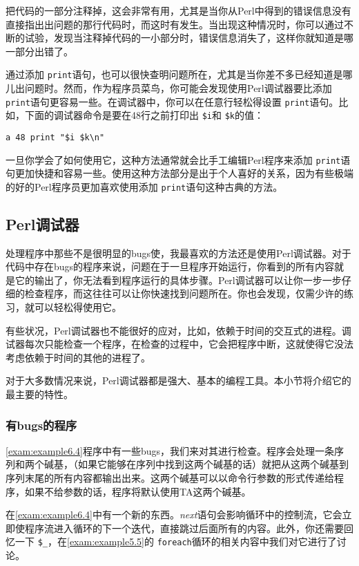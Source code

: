 把代码的一部分注释掉，这会非常有用，尤其是当你从Perl中得到的错误信息没有直接指出出问题的那行代码时，而这时有发生。当出现这种情况时，你可以通过不断的试验，发现当注释掉代码的一小部分时，错误信息消失了，这样你就知道是哪一部分出错了。

通过添加 \verb|print|语句，也可以很快查明问题所在，尤其是当你差不多已经知道是哪儿出问题时。然而，作为程序员菜鸟，你可能会发现使用Perl调试器要比添加 \verb|print|语句更容易一些。在调试器中，你可以在任意行轻松得设置 \verb|print|语句。比如，下面的调试器命令是要在48行之前打印出 \verb|$i|和 \verb|$k|的值：

\begin{lstlisting}
a 48 print "$i $k\n"
\end{lstlisting}

一旦你学会了如何使用它，这种方法通常就会比手工编辑Perl程序来添加 \verb|print|语句更加快捷和容易一些。使用这种方法部分是出于个人喜好的关系，因为有些极端的好的Perl程序员更加喜欢使用添加 \verb|print|语句这种古典的方法。

\subsection{Perl调试器}
处理程序中那些不是很明显的bugs使，我最喜欢的方法还是使用Perl调试器。对于代码中存在bugs的程序来说，问题在于一旦程序开始运行，你看到的所有内容就是它的输出了，你无法看到程序运行的具体步骤。Perl调试器可以让你一步一步仔细的检查程序，而这往往可以让你快速找到问题所在。你也会发现，仅需少许的练习，就可以轻松得使用它。

有些状况，Perl调试器也不能很好的应对，比如，依赖于时间的交互式的进程。调试器每次只能检查一个程序，在检查的过程中，它会把程序中断，这就使得它没法考虑依赖于时间的其他的进程了。

对于大多数情况来说，Perl调试器都是强大、基本的编程工具。本小节将介绍它的最主要的特性。

\subsubsection{有bugs的程序}
\autoref{exam:example6.4}程序中有一些bugs，我们来对其进行检查。程序会处理一条序列和两个碱基，（如果它能够在序列中找到这两个碱基的话）就把从这两个碱基到序列末尾的所有内容都输出出来。这两个碱基可以以命令行参数的形式传递给程序，如果不给参数的话，程序将默认使用TA这两个碱基。

在\autoref{exam:example6.4}中有一个新的东西。\textit{next}语句会影响循环中的控制流，它会立即使程序流进入循环的下一个迭代，直接跳过后面所有的内容。此外，你还需要回忆一下 \verb|$_|，在\autoref{exam:example5.5}的 \verb|foreach|循环的相关内容中我们对它进行了讨论。

